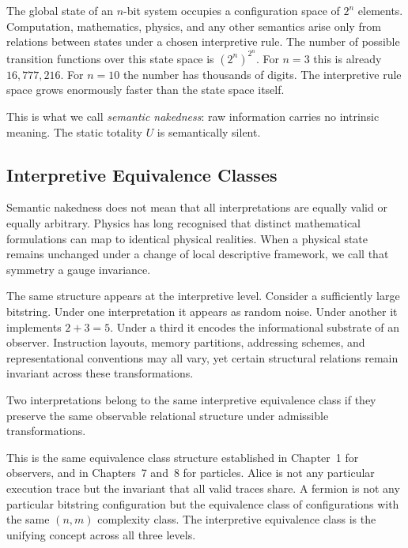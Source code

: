 The global state of an $n$-bit system occupies a configuration space
of $2^n$ elements. Computation, mathematics, physics, and any other
semantics arise only from relations between states under a chosen
interpretive rule. The number of possible transition functions over
this state space is $(2^n)^{2^n}$. For $n = 3$ this is already
$16{,}777{,}216$. For $n = 10$ the number has thousands of digits.
The interpretive rule space grows enormously faster than the state
space itself.

This is what we call \emph{semantic nakedness}: raw information carries
no intrinsic meaning. The static totality $U$ is semantically silent.

\subsection*{Interpretive Equivalence Classes}

Semantic nakedness does not mean that all interpretations are equally
valid or equally arbitrary. Physics has long recognised that distinct
mathematical formulations can map to identical physical realities. When
a physical state remains unchanged under a change of local descriptive
framework, we call that symmetry a gauge invariance.

The same structure appears at the interpretive level. Consider a
sufficiently large bitstring. Under one interpretation it appears as
random noise. Under another it implements $2 + 3 = 5$. Under a third
it encodes the informational substrate of an observer. Instruction
layouts, memory partitions, addressing schemes, and representational
conventions may all vary, yet certain structural relations remain
invariant across these transformations.

\begin{tcolorbox}[title=Interpretive Equivalence Class]
Two interpretations belong to the same interpretive equivalence class
if they preserve the same observable relational structure under
admissible transformations.
\end{tcolorbox}

This is the same equivalence class structure established in Chapter~1
for observers, and in Chapters~7 and~8 for particles. Alice is not any
particular execution trace but the invariant that all valid traces
share. A fermion is not any particular bitstring configuration but the
equivalence class of configurations with the same $(n, m)$ complexity
class. The interpretive equivalence class is the unifying concept
across all three levels.

